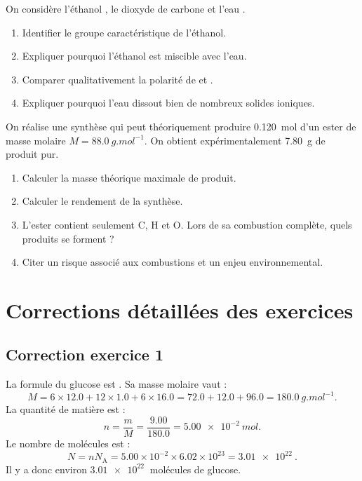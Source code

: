 \documentclass[11pt,a4paper]{article}
\newcommand{\Na}{N_{\mathrm A}}
\begin{document}
\begin{exercicebox}[title=Devoir bilan - Partie B : structure et solubilité]
On considère l'éthanol , le dioxyde de carbone  et l'eau .
\begin{enumerate}
\item Identifier le groupe caractéristique de l'éthanol.
\item Expliquer pourquoi l'éthanol est miscible avec l'eau.
\item Comparer qualitativement la polarité de  et .
\item Expliquer pourquoi l'eau dissout bien de nombreux solides ioniques.
\end{enumerate}
\end{exercicebox}

\begin{exercicebox}[title=Devoir bilan - Partie C : synthèse et combustion]
On réalise une synthèse qui peut théoriquement produire \SI{0.120}{mol} d'un ester de masse molaire $M=\SI{88.0}{g.mol^{-1}}$. On obtient expérimentalement \SI{7.80}{g} de produit pur.
\begin{enumerate}
\item Calculer la masse théorique maximale de produit.
\item Calculer le rendement de la synthèse.
\item L'ester contient seulement C, H et O. Lors de sa combustion complète, quels produits se forment ?
\item Citer un risque associé aux combustions et un enjeu environnemental.
\end{enumerate}
\end{exercicebox}

\newpage

\section{Corrections détaillées des exercices}

\subsection*{Correction exercice 1}
\begin{correctionbox}
La formule du glucose est . Sa masse molaire vaut :
\[
M=6\times12.0+12\times1.0+6\times16.0=72.0+12.0+96.0=\SI{180.0}{g.mol^{-1}}.
\]
La quantité de matière est :
\[
n=\frac{m}{M}=\frac{9.00}{180.0}=\SI{5.00e-2}{mol}.
\]
Le nombre de molécules est :
\[
N=n\Na=5.00\times10^{-2}\times6.02\times10^{23}=\SI{3.01e22}{}.
\]
Il y a donc environ $\SI{3.01e22}{}$ molécules de glucose.
\end{correctionbox}
\end{document}
